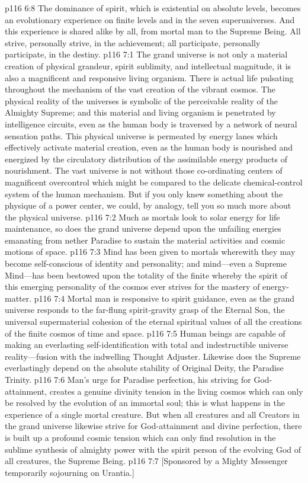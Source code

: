 \vs p116 6:8 The dominance of spirit, which is existential on absolute levels, becomes an evolutionary experience on finite levels and in the seven superuniverses. And this experience is shared alike by all, from mortal man to the Supreme Being. All strive, personally strive, in the achievement; all participate, personally participate, in the destiny.
\vs p116 7:1 The grand universe is not only a material creation of physical grandeur, spirit sublimity, and intellectual magnitude, it is also a magnificent and responsive living organism. There is actual life pulsating throughout the mechanism of the vast creation of the vibrant cosmos. The physical reality of the universes is symbolic of the perceivable reality of the Almighty Supreme; and this material and living organism is penetrated by intelligence circuits, even as the human body is traversed by a network of neural sensation paths. This physical universe is permeated by energy lanes which effectively activate material creation, even as the human body is nourished and energized by the circulatory distribution of the assimilable energy products of nourishment. The vast universe is not without those co\hyp{}ordinating centers of magnificent overcontrol which might be compared to the delicate chemical\hyp{}control system of the human mechanism. But if you only knew something about the physique of a power center, we could, by analogy, tell you so much more about the physical universe.
\vs p116 7:2 Much as mortals look to solar energy for life maintenance, so does the grand universe depend upon the unfailing energies emanating from nether Paradise to sustain the material activities and cosmic motions of space.
\vs p116 7:3 Mind has been given to mortals wherewith they may become self\hyp{}conscious of identity and personality; and mind---even a Supreme Mind---has been bestowed upon the totality of the finite whereby the spirit of this emerging personality of the cosmos ever strives for the mastery of energy\hyp{}matter.
\vs p116 7:4 Mortal man is responsive to spirit guidance, even as the grand universe responds to the far\hyp{}flung spirit\hyp{}gravity grasp of the Eternal Son, the universal supermaterial cohesion of the eternal spiritual values of all the creations of the finite cosmos of time and space.
\vs p116 7:5 Human beings are capable of making an everlasting self\hyp{}identification with total and indestructible universe reality---fusion with the indwelling Thought Adjuster. Likewise does the Supreme everlastingly depend on the absolute stability of Original Deity, the Paradise Trinity.
\vs p116 7:6 Man’s urge for Paradise perfection, his striving for God\hyp{}attainment, creates a genuine divinity tension in the living cosmos which can only be resolved by the evolution of an immortal soul; this is what happens in the experience of a single mortal creature. But when all creatures and all Creators in the grand universe likewise strive for God\hyp{}attainment and divine perfection, there is built up a profound cosmic tension which can only find resolution in the sublime synthesis of almighty power with the spirit person of the evolving God of all creatures, the Supreme Being.\plusone
\vsetoff
\vs p116 7:7 [Sponsored by a Mighty Messenger temporarily sojourning on Urantia.]
